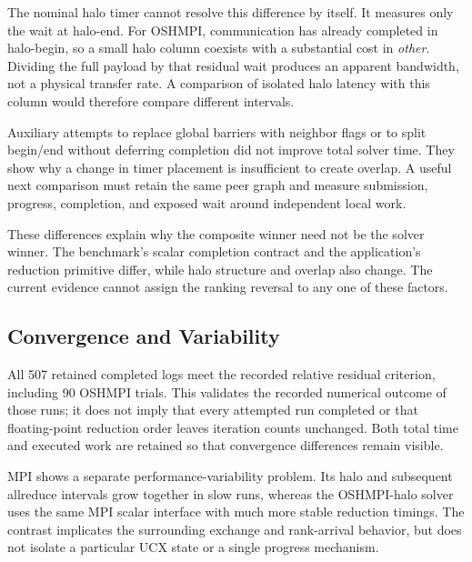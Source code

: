 \begin{table}[htbp]
\centering
\caption{Application halo signatures reconstructed from the fixed sparse partitions. Volume is mean outgoing KiB per rank and exchange, excluding reductions.}
\label{tab:m-acg-halo-signatures}
\footnotesize

\end{table}

The nominal halo timer cannot resolve this difference by itself. It measures only the wait at halo-end. For OSHMPI, communication has already completed in halo-begin, so a small halo column coexists with a substantial cost in \emph{other}. Dividing the full payload by that residual wait produces an apparent bandwidth, not a physical transfer rate. A comparison of isolated halo latency with this column would therefore compare different intervals.

Auxiliary attempts to replace global barriers with neighbor flags or to split begin/end without deferring completion did not improve total solver time. They show why a change in timer placement is insufficient to create overlap. A useful next comparison must retain the same peer graph and measure submission, progress, completion, and exposed wait around independent local work.

These differences explain why the composite winner need not be the solver winner. The benchmark's scalar completion contract and the application's reduction primitive differ, while halo structure and overlap also change. The current evidence cannot assign the ranking reversal to any one of these factors.

\subsection{Convergence and Variability}

All 507 retained completed logs meet the recorded relative residual criterion, including 90 OSHMPI trials. This validates the recorded numerical outcome of those runs; it does not imply that every attempted run completed or that floating-point reduction order leaves iteration counts unchanged. Both total time and executed work are retained so that convergence differences remain visible.

MPI shows a separate performance-variability problem. Its halo and subsequent allreduce intervals grow together in slow runs, whereas the OSHMPI-halo solver uses the same MPI scalar interface with much more stable reduction timings. The contrast implicates the surrounding exchange and rank-arrival behavior, but does not isolate a particular UCX state or a single progress mechanism.

